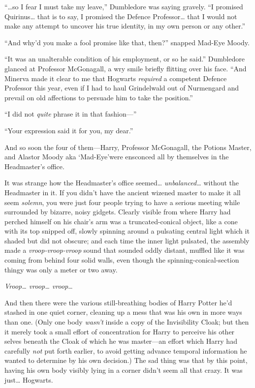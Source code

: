``\ldots{}so I fear I must take my leave,'' Dumbledore was saying
gravely. ``I promised Quirinus\ldots{} that is to say, I promised the
Defence Professor\ldots{} that I would not make any attempt to uncover
his true identity, in my own person or any other.''

``And why'd you make a fool promise like that, then?'' snapped Mad-Eye
Moody.

``It was an unalterable condition of his employment, or so he said.''
Dumbledore glanced at Professor McGonagall, a wry smile briefly flitting
over his face. ``And Minerva made it clear to me that Hogwarts
\emph{required} a competent Defence Professor this year, even if I had
to haul Grindelwald out of Nurmengard and prevail on old affections to
persuade him to take the position.''

``I did not \emph{quite} phrase it in that fashion---''

``Your expression said it for you, my dear.''

And so soon the four of them---Harry, Professor McGonagall, the Potions
Master, and Alastor Moody aka `Mad-Eye'were ensconced all by themselves
in the Headmaster's office.

It was strange how the Headmaster's office seemed\ldots{}
\emph{unbalanced\ldots{}} without the Headmaster in it. If you didn't
have the ancient wizened master to make it all seem \emph{solemn}, you
were just four people trying to have a serious meeting while surrounded
by bizarre, noisy gidgets. Clearly visible from where Harry had perched
himself on his chair's arm was a truncated-conical object, like a cone
with its top snipped off, slowly spinning around a pulsating central
light which it shaded but did not obscure; and each time the inner light
pulsated, the assembly made a \emph{vroop-vroop-vroop} sound that
sounded oddly distant, muffled like it was coming from behind four solid
walls, even though the spinning-conical-section thingy was only a meter
or two away.

\emph{Vroop\ldots{} vroop\ldots{} vroop}\ldots{}

And then there were the various still-breathing bodies of Harry Potter
he'd stashed in one quiet corner, cleaning up a mess that was his own in
more ways than one. (Only one body \emph{wasn't} inside a copy of the
Invisibility Cloak; but then it merely took a small effort of
concentration for Harry to perceive his other selves beneath the Cloak
of which he was master---an effort which Harry had carefully \emph{not}
put forth earlier, to avoid getting advance temporal information he
wanted to determine by his own decision.) The sad thing was that by this
point, having his own body visibly lying in a corner didn't seem all
that crazy. It was just\ldots{} Hogwarts.

